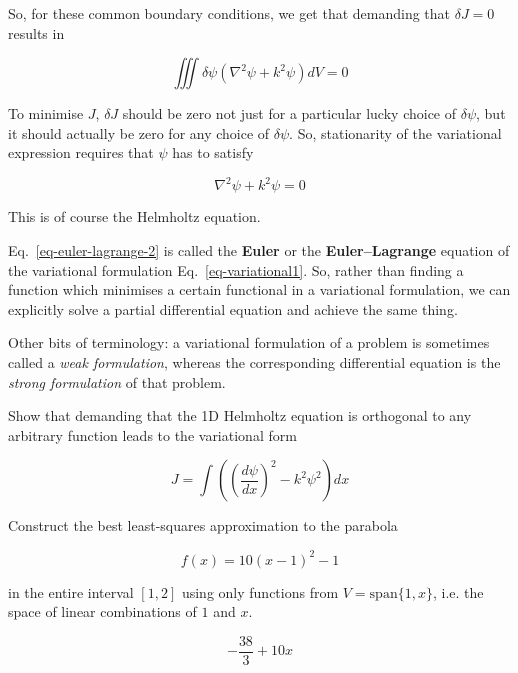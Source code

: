 So, for these common boundary conditions, we get that demanding that $\delta J = 0$ results in

\begin{equation}
\iiint \delta \psi (\nabla^2 \psi + k^2 \psi ) dV = 0
\end{equation} 

To minimise $J$, $\delta J$ should be zero not just for a particular lucky choice of $\delta \psi$, but it should actually be zero for any choice of $\delta \psi$. So, stationarity of the variational expression requires that $\psi$ has to satisfy

\begin{equation}
\nabla^2 \psi + k^2 \psi = 0 \label{eq-euler-lagrange-2}
\end{equation} 

This is of course the Helmholtz equation.

Eq.~\ref{eq-euler-lagrange-2} is called the \textbf{Euler} or the \textbf{Euler--Lagrange} equation of the variational formulation Eq.~\ref{eq-variational1}. So, rather than finding a function which minimises a certain functional in a variational formulation, we can explicitly solve a partial differential equation and achieve the same thing.

Other bits of terminology: a variational formulation of a problem is sometimes called a \emph{weak formulation}, whereas the corresponding differential equation is the \emph{strong formulation} of that problem.

\pagebreak

\begin{exer}
Show that demanding that the 1D Helmholtz equation is orthogonal to any arbitrary function leads to the variational form 

$$J = \int \left( \left(\frac{d \psi}{d x}\right)^2 - k^2 \psi^2 \right) dx$$

\end{exer}


\begin{exer}
  
Construct the best least-squares approximation to the parabola 

$$f(x) = 10(x-1)^2 -1$$ 

in the entire interval $[1,2]$ using only functions from $V = \mathrm{span} \{1, x\}$, i.e. the space of linear combinations of $1$ and $x$.

\begin{sol}
$$-\frac{38}{3} + 10x$$   
\end{sol}
\end{exer}


